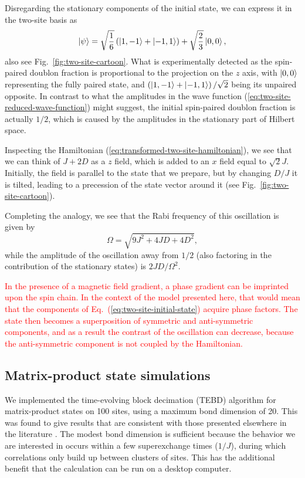 \documentclass[aps,prl,twocolumn,superscriptaddress]{revtex4-1}
\newcommand{\newmat}[1]{\textcolor{red}{#1}}
\begin{document}
Disregarding the stationary components of the initial state, we can express it in the two-site basis as
\begin{equation}\label{eq:two-site-reduced-wave-function}
    \ket{\psi} = \sqrt{\frac{1}{6}} \left( \ket{1, -1} + \ket{-1, 1} \right) + \sqrt{\frac{2}{3}} \ket{0, 0},
\end{equation}
also see Fig.~\ref{fig:two-site-cartoon}. What is experimentally detected as the spin-paired doublon fraction is proportional to the projection on the $z$ axis, with $\ket{0,0}$ representing the fully paired state, and $\left(\ket{1,-1} + \ket{-1, 1}\right)/\sqrt{2}$ being its unpaired opposite. In contrast to what the amplitudes in the wave function (\ref{eq:two-site-reduced-wave-function}) might suggest, the initial spin-paired doublon fraction is actually $1/2$, which is caused by the amplitudes in the stationary part of Hilbert space.

Inspecting the Hamiltonian (\ref{eq:transformed-two-site-hamiltonian}), we see that we can think of $J + 2D$ as a $z$ field, which is added to an $x$ field equal to $\sqrt{2}J$. Initially, the field is parallel to the state that we prepare, but by changing $D/J$ it is tilted, leading to a precession of the state vector around it (see Fig.~\ref{fig:two-site-cartoon}).

Completing the analogy, we see that the Rabi frequency of this oscillation is given by
\begin{equation}\label{eq:two-site-rabi}
    \Omega = \sqrt{9J^2 + 4JD + 4D^2},
\end{equation}
while the amplitude of the oscillation away from $1/2$ (also factoring in the contribution of the stationary states) is $2JD/\Omega^2$.

\newmat{In the presence of a magnetic field gradient, a phase gradient can be imprinted upon the spin chain. In the context of the model presented here, that would mean that the components of Eq.~(\ref{eq:two-site-initial-state}) acquire phase factors. The state then becomes a superposition of symmetric and anti-symmetric components, and as a result the contrast of the oscillation can decrease, because the anti-symmetric component is not coupled by the Hamiltonian.}

\subsection*{Matrix-product state simulations}
We implemented the time-evolving block decimation (TEBD) algorithm for matrix-product states \cite{Hauschild2018, Vidal2004} on 100 sites, using a maximum bond dimension of 20. This was found to give results that are consistent with those presented elsewhere in the literature \cite{Venegas-Gomez2020}. The modest bond dimension is sufficient because the behavior we are interested in occurs within a few superexchange times ($1/J$), during which correlations only build up between clusters of sites. This has the additional benefit that the calculation can be run on a desktop computer. 
\end{document}
